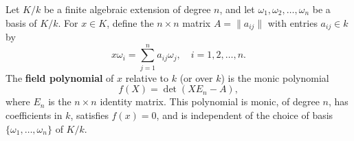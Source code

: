 Let $K/k$ be a finite algebraic extension of degree $n$, and let $\omega_1, \omega_2, \dots, \omega_n$ be a basis of $K/k$. For $x \in K$, define the $n \times n$ matrix $A = \|a_{ij}\|$ with entries $a_{ij} \in k$ by
$$x\omega_i = \sum_{j=1}^{n} a_{ij}\omega_j, \quad i = 1, 2, \dots, n.$$
The \textbf{field polynomial} of $x$ relative to $k$ (or over $k$) is the monic polynomial
$$f(X) = \det(X E_n - A),$$
where $E_n$ is the $n \times n$ identity matrix. This polynomial is monic, of degree $n$, has coefficients in $k$, satisfies $f(x) = 0$, and is independent of the choice of basis $\{\omega_1, \dots, \omega_n\}$ of $K/k$.
